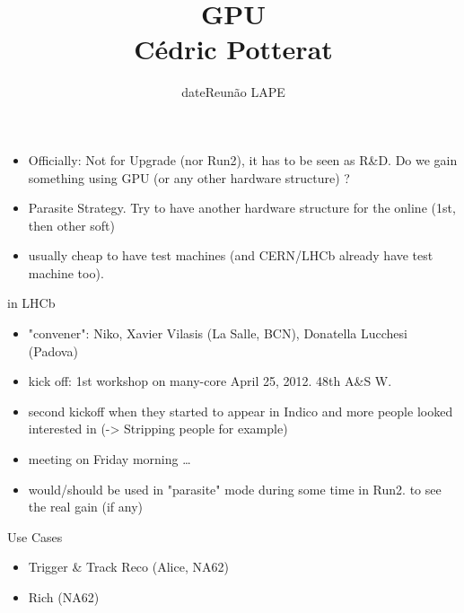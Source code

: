 \documentclass[compress,10pt]{beamer}
\title{\vspace{-1.0cm}GPU\\
  \vspace{2.7cm}
  \small{C\'edric Potterat}
}
\author{\vspace{4.3cm}\scriptsize{date}\hfill\small{{Reun\~{a}o LAPE}}}
\begin{document}

\maketitle




\begin{frame}
  \frametitle{} 
   \begin{block}{}
  \begin{itemize}
   \item Officially: Not for Upgrade (nor Run2), it has to be seen as R\&D. Do we gain something using GPU (or any other hardware structure) ?
    \item Parasite Strategy. Try to have another hardware structure for the online (1st, then other soft) 
    \item usually cheap to have test machines (and CERN/LHCb already have test machine too).
       \end{itemize}
  \end{block}

 \begin{block}{in LHCb}
  \begin{itemize}
   \item "convener": Niko, Xavier Vilasis (La Salle, BCN), Donatella Lucchesi (Padova)
   \item kick off: 1st workshop on many-core April 25, 2012. 48th A\&S W. 
   \item second kickoff when they started to appear in Indico and more people looked interested in (-> Stripping people for example)
   \item meeting on Friday morning \ldots
   \item would/should be used in "parasite" mode during some time in Run2. to see the real gain (if any)
       \end{itemize}
  \end{block}


  \begin{block}{Use Cases}
  \begin{itemize}
   \item Trigger \& Track Reco (Alice, NA62)
   \item Rich (NA62)
       \end{itemize}
   \end{block}

\end{frame}
\end{document}
